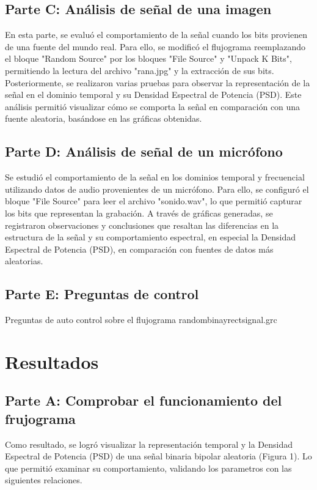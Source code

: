 \documentclass{journal}[IEEEtran, twocolumn]             %
\begin{document}
\begin{multicols}{2}
 
\subsection{Parte C: Análisis de señal de una imagen}
En esta parte, se evaluó el comportamiento de la señal cuando los bits provienen de una fuente del mundo real. Para ello, se modificó el flujograma reemplazando el bloque "Random Source" por los bloques "File Source" y "Unpack K Bits", permitiendo la lectura del archivo "rana.jpg" y la extracción de sus bits. Posteriormente, se realizaron varias pruebas para observar la representación de la señal en el dominio temporal y su Densidad Espectral de Potencia (PSD). Este análisis permitió visualizar cómo se comporta la señal en comparación con una fuente aleatoria, basándose en las gráficas obtenidas.

\subsection{Parte D: Análisis de señal de un micrófono}
Se estudió el comportamiento de la señal en los dominios temporal y frecuencial utilizando datos de audio provenientes de un micrófono. Para ello, se configuró el bloque "File Source" para leer el archivo "sonido.wav", lo que permitió capturar los bits que representan la grabación. A través de gráficas generadas, se registraron observaciones y conclusiones que resaltan las diferencias en la estructura de la señal y su comportamiento espectral, en especial la Densidad Espectral de Potencia (PSD), en comparación con fuentes de datos más aleatorias.

\subsection{Parte E: Preguntas de control}
Preguntas de auto control sobre el flujograma randombinayrectsignal.grc
    
\section{Resultados}
\subsection{Parte A: Comprobar el funcionamiento del frujograma}

Como resultado, se logró visualizar la representación temporal y la Densidad Espectral de Potencia (PSD) de una señal binaria bipolar aleatoria (Figura 1). Lo que permitió examinar su comportamiento, validando los parametros con las siguientes relaciones.


\end{multicols}
\end{document}
